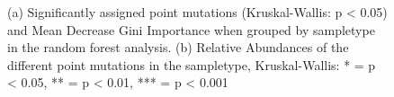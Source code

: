 
\begin{figure}[h]
    \centering
    \caption{(a) Significantly assigned point mutations (Kruskal-Wallis: p < 0.05) and Mean Decrease Gini Importance when grouped by sampletype in the random forest analysis. (b) Relative Abundances of the different point mutations in the sampletype, Kruskal-Wallis: * = p < 0.05, ** = p < 0.01, *** = p < 0.001}
    \label{snps_sampletype}
\end{figure}


